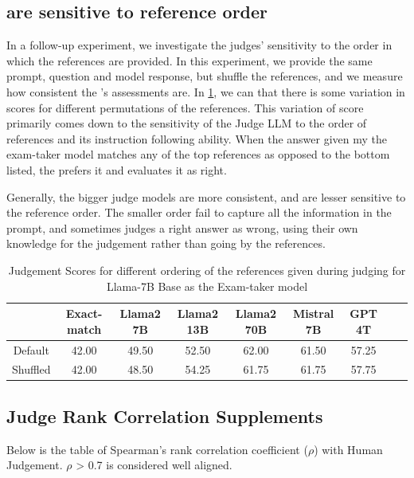 \subsection{\Judgemodels are sensitive to reference order}
In a follow-up experiment, we investigate the judges' sensitivity to the order in which the references are provided.
In this experiment, we provide the same prompt, question and model response, but shuffle the references, and we measure how consistent the \judgemodel's assessments are.
In \cref{table:reference_consistency}, we can that there is some variation in scores for different permutations of the references. 
This variation of score primarily comes down to the sensitivity of the Judge LLM to the order of references and its instruction following ability.
When the answer given my the exam-taker model matches any of the top references as opposed to the bottom listed, the \judgemodel prefers it and evaluates it as right. 

Generally, the bigger judge models are more consistent, and are lesser sensitive to the reference order. 
The smaller order fail to capture all the information in the prompt, and sometimes judges a right answer as wrong, using their own knowledge for the judgement rather than going by the references. 

\begin{table}[h]
\centering
\vspace{0.5em} %
\begin{tabular}{|c|c|c|c|c|c|c|c|c|}
\hline
& Exact-match & Llama2 7B & Llama2 13B & Llama2 70B & Mistral 7B & GPT 4T \\
\hline
Default & 42.00 & 49.50 & 52.50 & 62.00 & 61.50 & 57.25\\
\hline
Shuffled & 42.00 & 48.50 & 54.25 & 61.75 & 61.75 & 57.75\\
\hline
\end{tabular}
\vspace{1em} %
\caption{Judgement Scores for different ordering of the references given during judging for Llama-7B Base as the Exam-taker model}\label{table:reference_consistency}
\end{table}

\subsection{Judge Rank Correlation Supplements}
\label{app:correlationcoefftable}
Below is the table of Spearman's rank correlation coefficient ($\rho$) with Human Judgement. $\rho$ > 0.7 is considered well aligned. 

